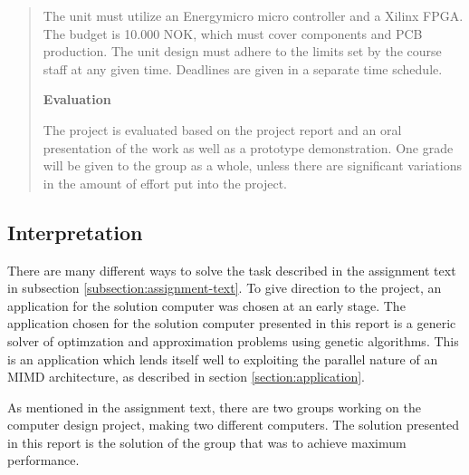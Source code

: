 \begin{quote}
The unit must utilize an Energymicro micro controller and a Xilinx FPGA.
The budget is 10.000 NOK, which must cover components and PCB production.
The unit design must adhere to the limits set by the course staff at any given time.
Deadlines are given in a separate time schedule.

\textbf{Evaluation}

The project is evaluated based on the project report and an oral presentation of the work as well as a prototype demonstration.
One grade will be given to the group as a whole, unless there are significant variations in the amount of effort put into the project. 

\end{quote}

\subsection{Interpretation}

There are many different ways to solve the task described in the assignment text in subsection \vref{subsection:assignment-text}.
To give direction to the project, an application for the solution computer was chosen at an early stage.
The application chosen for the solution computer presented in this report is a generic solver of optimzation and approximation problems using genetic algorithms.
This is an application which lends itself well to exploiting the parallel nature of an MIMD architecture, as described in section \vref{section:application}.

As mentioned in the assignment text\cn, there are two groups working on the computer design project, making two different computers.
The solution presented in this report is the solution of the group that was to achieve maximum performance.
